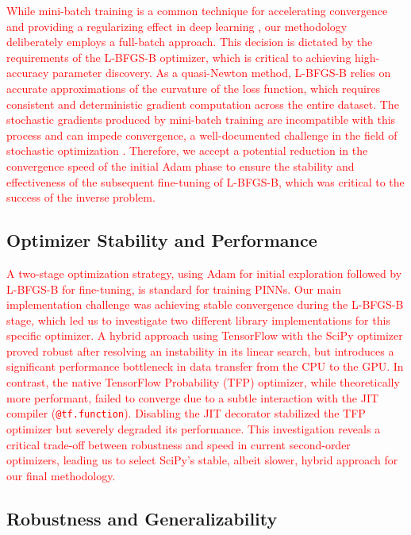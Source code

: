 \documentclass[12pt,fleqn]{article}
\begin{document}
\textcolor{red}{While mini-batch training is a common technique for accelerating convergence and providing a regularizing effect in deep learning \citep{goodfellow2016}, our methodology deliberately employs a full-batch approach. This decision is dictated by the requirements of the L-BFGS-B optimizer, which is critical to achieving high-accuracy parameter discovery. As a quasi-Newton method, L-BFGS-B relies on accurate approximations of the curvature of the loss function, which requires consistent and deterministic gradient computation across the entire dataset. The stochastic gradients produced by mini-batch training are incompatible with this process and can impede convergence, a well-documented challenge in the field of stochastic optimization \citep{byrd2016}. Therefore, we accept a potential reduction in the convergence speed of the initial Adam phase to ensure the stability and effectiveness of the subsequent fine-tuning of L-BFGS-B, which was critical to the success of the inverse problem.}

\subsection{Optimizer Stability and Performance}

\textcolor{red}{A two-stage optimization strategy, using Adam for initial exploration followed by L-BFGS-B for fine-tuning, is standard for training PINNs. Our main implementation challenge was achieving stable convergence during the L-BFGS-B stage, which led us to investigate two different library implementations for this specific optimizer. A hybrid approach using TensorFlow with the SciPy optimizer proved robust after resolving an instability in its linear search, but introduces a significant performance bottleneck in data transfer from the CPU to the GPU. In contrast, the native TensorFlow Probability (TFP) optimizer, while theoretically more performant, failed to converge due to a subtle interaction with the JIT compiler (\texttt{@tf.function}). Disabling the JIT decorator stabilized the TFP optimizer but severely degraded its performance. This investigation reveals a critical trade-off between robustness and speed in current second-order optimizers, leading us to select SciPy's stable, albeit slower, hybrid approach for our final methodology.}

\subsection{Robustness and Generalizability}
\end{document}
